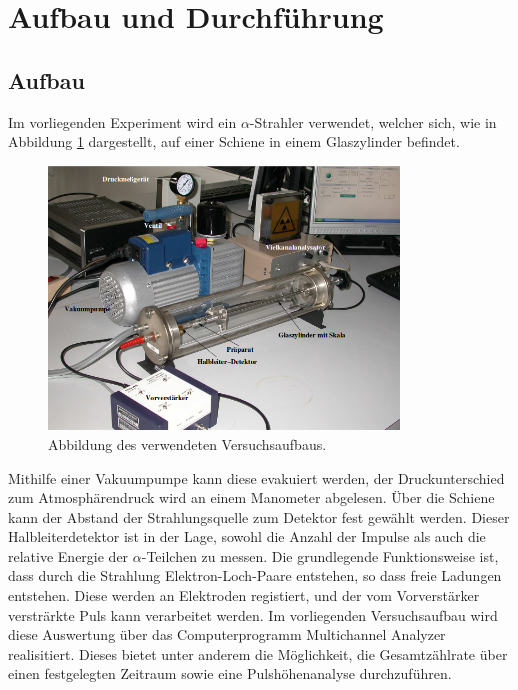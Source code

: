 \section{Aufbau und Durchführung}
\subsection{Aufbau}
\label{sec:Aufbau}
Im vorliegenden Experiment wird ein $\alpha$-Strahler verwendet, welcher sich, wie in Abbildung \ref{abb:1} dargestellt, auf einer Schiene in einem Glaszylinder befindet.
\begin{figure}
  \centering
  \includegraphics[height=7cm]{ressources/aufbau.png}
  \caption{Abbildung des verwendeten Versuchsaufbaus. \cite{skript}}
  \label{abb:1}
\end{figure}
Mithilfe einer Vakuumpumpe kann diese evakuiert werden, der Druckunterschied zum Atmosphärendruck wird an einem Manometer abgelesen.
Über die Schiene kann der Abstand der Strahlungsquelle zum Detektor fest gewählt werden.
Dieser Halbleiterdetektor ist in der Lage, sowohl die Anzahl der Impulse als auch die relative Energie der $\alpha$-Teilchen zu messen.
Die grundlegende Funktionsweise ist, dass durch die Strahlung Elektron-Loch-Paare entstehen, so dass freie Ladungen entstehen.
Diese werden an Elektroden registiert, und der vom Vorverstärker versträrkte Puls kann verarbeitet werden.
Im vorliegenden Versuchsaufbau wird diese Auswertung über das Computerprogramm Multichannel Analyzer realisitiert.
Dieses bietet unter anderem die Möglichkeit, die Gesamtzählrate über einen festgelegten Zeitraum sowie eine Pulshöhenanalyse durchzuführen.
